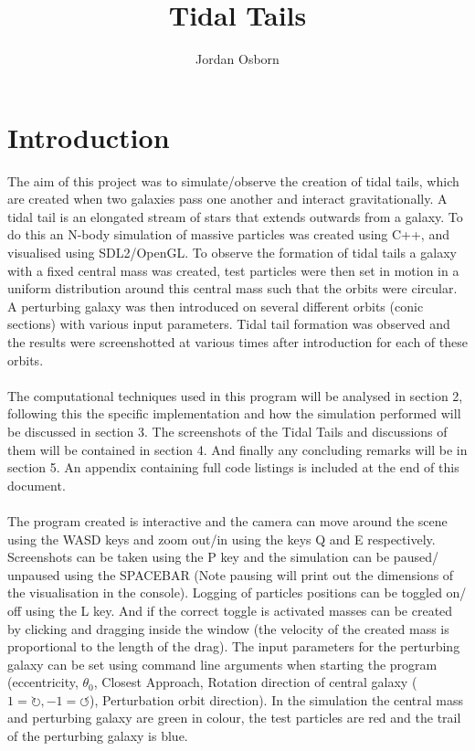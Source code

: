 \documentclass[10pt,a4paper]{article}
\begin{document}
\begin{titlingpage}
\title{Tidal Tails}
\author{Jordan Osborn}
\maketitle
\begin{abstract}
	
\end{abstract}
	
	
\end{titlingpage}

\clearpage
\section{Introduction}
The aim of this project was to simulate/observe the creation of tidal tails, which are created when two galaxies pass one another and interact gravitationally. A tidal tail is an elongated stream of stars that extends outwards from a galaxy.  To do this an N-body simulation of massive particles was created using C++, and visualised using SDL2/OpenGL. To observe the formation of tidal tails a galaxy with a fixed central mass was created, test particles were then set in motion in a uniform distribution around this central mass such that the orbits were circular. A perturbing galaxy was then introduced on several different orbits (conic sections) with various input parameters. Tidal tail formation was observed and the results were screenshotted at various times after introduction for each of these orbits. 
\\
\\
The computational techniques used in this program will be analysed in section 2, following this the specific implementation and how the simulation performed will be discussed in section 3. The screenshots of the Tidal Tails and discussions of them will be contained in section 4. And finally any concluding remarks will be in section 5. An appendix containing full code listings is included at the end of this document. 
\\
\\
The program created is interactive and the camera can move around the scene using the WASD keys and zoom out/in using the keys Q and E respectively. Screenshots can be taken using the P key and the simulation can be paused/ unpaused using the SPACEBAR (Note pausing will print out the dimensions of the visualisation in the console). Logging of particles positions can be toggled on/ off using the L key. And if the correct toggle is activated masses can be created by clicking and dragging inside the window (the velocity of the created mass is proportional to the length of the drag). The input parameters for the perturbing galaxy can be set using command line arguments when starting the program (eccentricity, $\theta_0$, Closest Approach, Rotation direction of central galaxy ($1=\circlearrowright, -1=\circlearrowleft$), Perturbation orbit direction). In the simulation the central mass and perturbing galaxy are green in colour, the test particles are red and the trail of the perturbing galaxy is blue.
\end{document}
